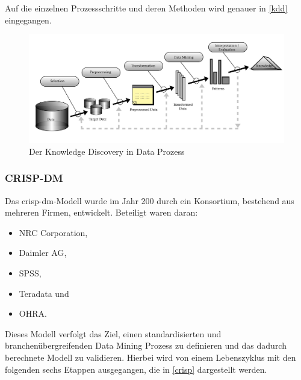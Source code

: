 Auf die einzelnen Prozessschritte und deren Methoden wird genauer in \vref{kdd} eingegangen. 
\begin{figure}[H]
\centering
\includegraphics[scale=0.85]{se-wa-jpg/kdd}
\caption[Der Knowledge Discovery in Data Prozess]{Der Knowledge Discovery in Data Prozess\protect\footnotemark}
\label{kddpic}
\end{figure}


\subsubsection{CRISP-DM}
Das \gls{crisp-dm}-Modell wurde im Jahr 200 durch ein Konsortium, bestehend aus mehreren Firmen, entwickelt. Beteiligt waren daran:

\begin{itemize}
\item NRC Corporation,
\item Daimler AG,
\item SPSS,
\item Teradata und
\item OHRA.
\end{itemize}

Dieses Modell verfolgt das Ziel, einen standardisierten und branchenübergreifenden Data Mining Prozess zu definieren und das dadurch berechnete Modell zu validieren. Hierbei wird von einem Lebenszyklus mit den folgenden sechs Etappen ausgegangen, die in \vref{crisp} dargestellt werden.

